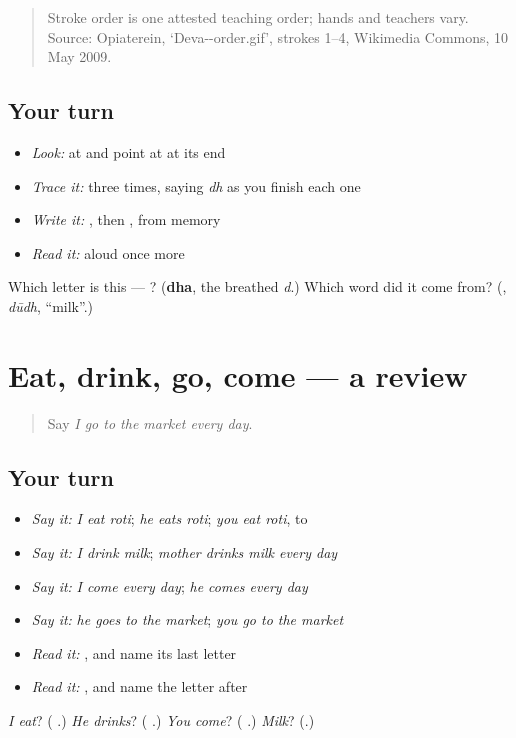 \begin{quote}
Stroke order is one attested teaching order; hands and teachers vary. Source: Opiaterein, ‘Deva--order.gif’, strokes 1–4, Wikimedia Commons, 10 May 2009.
\end{quote}

\subsection*{Your turn}
\begin{itemize}
\raggedright
  \item \emph{Look:} at \textbf{} and point at  at its end
  \item \emph{Trace it:}  three times, saying \emph{dh} as you finish each one
  \item \emph{Write it:} , then , from memory
  \item \emph{Read it:} \textbf{} aloud once more
\end{itemize}

\begin{tcolorbox}[breakable,colback=teal!4,colframe=teal!35!black,title={Before you move on}]
Which letter is this — ? (\textbf{dha}, the breathed \emph{d}.) Which word did it come from? (\textbf{}, \emph{dūdh}, \textquotedblleft{}milk\textquotedblright{}.)
\end{tcolorbox}
\section[(dialogue)]{Eat, drink, go, come — a review}

\label{lesson:MW-R155-eat-drink-go-come}



\begin{quote}
Say \emph{I go to the market every day}.
\end{quote}

\subsection*{Your turn}
\begin{itemize}
\raggedright
  \item \emph{Say it:} \emph{I eat roti}; \emph{he eats roti}; \emph{you eat roti}, to \textbf{}
  \item \emph{Say it:} \emph{I drink milk}; \emph{mother drinks milk every day}
  \item \emph{Say it:} \emph{I come every day}; \emph{he comes every day}
  \item \emph{Say it:} \emph{he goes to the market}; \emph{you go to the market}
  \item \emph{Read it:} \textbf{}, and name its last letter
  \item \emph{Read it:} \textbf{}, and name the letter after \textbf{}
\end{itemize}

\begin{tcolorbox}[breakable,colback=teal!4,colframe=teal!35!black,title={Before you move on}]
\emph{I eat}? (\textbf{ }.) \emph{He drinks}? (\textbf{ }.) \emph{You come}? (\textbf{ }.) \emph{Milk}? (\textbf{}.)
\end{tcolorbox}
